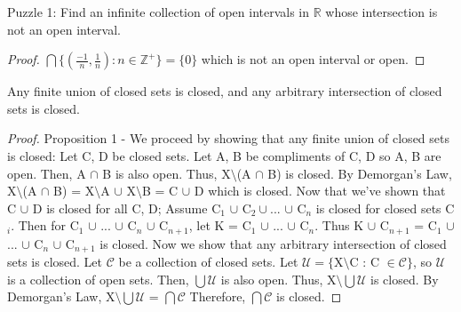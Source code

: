\documentclass{article}
\begin{document}
	\begin{proposition}
	Puzzle 1: Find an infinite collection of open intervals in $\mathbb{R}$ whose intersection is not an open interval.
	\end{proposition}
	\begin{proof}
	$\bigcap\lbrace (\frac{-1}{n}, \frac{1}{n}) : n \in \mathbb{Z}^+\rbrace = \lbrace 0 \rbrace$ which is not an open interval or open.
	\end{proof}

  \begin{proposition}
      Any finite union of closed sets is closed, and any arbitrary intersection of closed sets is closed.
  \end{proposition}
  \begin{proof}
  	Proposition 1 - We proceed by showing that any finite union of closed sets is closed:
  	\newline
  	Let C, D be closed sets.
  	\newline
  	Let A, B be compliments of C, D so A, B are open.
  	\newline
  	Then, A $\cap$ B is also open.
  	\newline
  	Thus, X$\setminus$(A $\cap$ B) is closed.
  	\newline
  	By Demorgan's Law, X$\setminus$(A $\cap$ B) = X$\setminus$A $\cup$ X$\setminus$B = C $\cup$ D which is closed.
  	\newline\newline
	Now that we've shown that C $\cup$ D is closed for all C, D; Assume C$_1$ $\cup $ C$_2 \cup ...$ $\cup $ C$_n$ is closed for closed sets C$_i$. Then for C$_1$ $\cup$ ... $\cup$ C$_n$ $\cup$ C$_{n+1}$, let K = C$_1$ $\cup$ ... $\cup$ C$_n$. Thus K $\cup$ C$_{n+1}$ = C$_1$ $\cup$ ... $\cup$ C$_n$ $\cup$ C$_{n+1}$ is closed.
	\newline
	Now we show that any arbitrary intersection of closed sets is closed.
  	\newline
  	Let $\mathcal{C}$ be a collection of closed sets.
  	\newline
  	Let $\mathcal{U} = \lbrace$X$\setminus$C : C $\in \mathcal{C}\rbrace$, so $\mathcal{U}$ is a collection of open sets.
  	\newline
  	Then, $\bigcup \mathcal{U}$ is also open.
  	\newline
  	Thus, X$\setminus\bigcup\mathcal{U}$ is closed.
  	\newline
  	By Demorgan's Law, X$\setminus\bigcup\mathcal{U}$ = $\bigcap\mathcal{C}$
  	\newline
  	Therefore, $\bigcap\mathcal{C}$ is closed.
	\end{proof}
\end{document}
